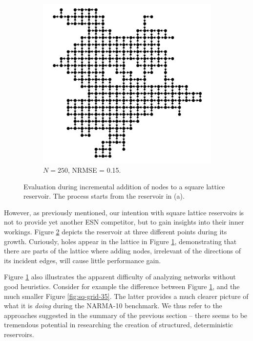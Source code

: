 \begin{figure}[t]
\begin{subfigure}{.49\textwidth}
\includegraphics[width=1.0\linewidth]{figures/sq-grid-grow-250.png}
    \caption{$N = 250$, NRMSE = 0.15.}
    \label{fig:sq-grid-grow-250}
  \end{subfigure}
  \caption{
    Evaluation during incremental addition of nodes to a square lattice
reservoir. The process starts from the reservoir in (a).
  }
  \label{fig:sq-grid-grow}
\end{figure}

However, as previously mentioned, our intention with square lattice reservoirs
is not to provide yet another ESN competitor, but to gain insights into their
inner workings. Figure \ref{fig:sq-grid-grow} depicts the reservoir at three
different points during its growth. Curiously, holes appear in the lattice in
Figure \ref{fig:sq-grid-grow-250}, demonstrating that there are parts of the
lattice where adding nodes, irrelevant of the directions of its incident edges,
will cause little performance gain.

Figure \ref{fig:sq-grid-grow-250} also illustrates the apparent difficulty of
analyzing networks without good heuristics. Consider for example the difference
between Figure \ref{fig:sq-grid-grow-250}, and the much smaller Figure
\ref{fig:sq-grid-35}. The latter provides a much clearer picture of what it is
\textit{doing} during the NARMA-10 benchmark. We thus refer to the approaches
suggested in the summary of the previous section -- there seems to be tremendous
potential in researching the creation of structured, deterministic reservoirs.

